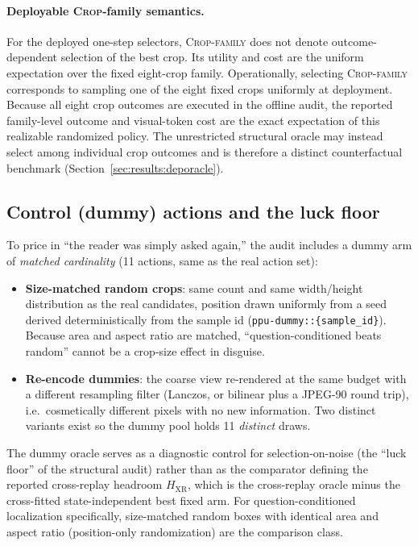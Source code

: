 \documentclass[10pt]{article}
\begin{document}
\paragraph{Deployable \textsc{Crop}-family semantics.}
For the deployed one-step selectors, \textsc{Crop-family} does not denote
outcome-dependent selection of the best crop. Its utility and cost are the
uniform expectation over the fixed eight-crop family. Operationally,
selecting \textsc{Crop-family} corresponds to sampling one of the eight
fixed crops uniformly at deployment. Because all eight crop outcomes are
executed in the offline audit, the reported family-level outcome and
visual-token cost are the exact expectation of this realizable randomized
policy. The unrestricted structural oracle may instead select among
individual crop outcomes and is therefore a distinct counterfactual
benchmark (Section~\ref{sec:results:deporacle}).

\subsection{Control (dummy) actions and the luck floor}

To price in ``the reader was simply asked again,'' the audit includes a
dummy arm of \emph{matched cardinality} (11 actions, same as the real
action set):
\begin{itemize}
\item \textbf{Size-matched random crops}: same count and same
  width/height distribution as the real candidates, position drawn
  uniformly from a seed derived deterministically from the sample id
  (\texttt{ppu-dummy::\{sample\_id\}}). Because area and aspect ratio are
  matched, ``question-conditioned beats random'' cannot be a crop-size
  effect in disguise.
\item \textbf{Re-encode dummies}: the coarse view re-rendered at the same
  budget with a different resampling filter (Lanczos, or bilinear plus a
  JPEG-90 round trip), i.e.\ cosmetically different pixels with no new
  information. Two distinct variants exist so the dummy pool holds 11
  \emph{distinct} draws.
\end{itemize}
The dummy oracle serves as a diagnostic control for selection-on-noise
(the ``luck floor'' of the structural audit) rather than as the comparator
defining the reported cross-replay headroom $H_{\mathrm{XR}}$, which is the
cross-replay oracle minus the cross-fitted state-independent best fixed
arm.
For question-conditioned localization specifically, size-matched random
boxes with identical area and aspect ratio (position-only randomization)
are the comparison class.
\end{document}
